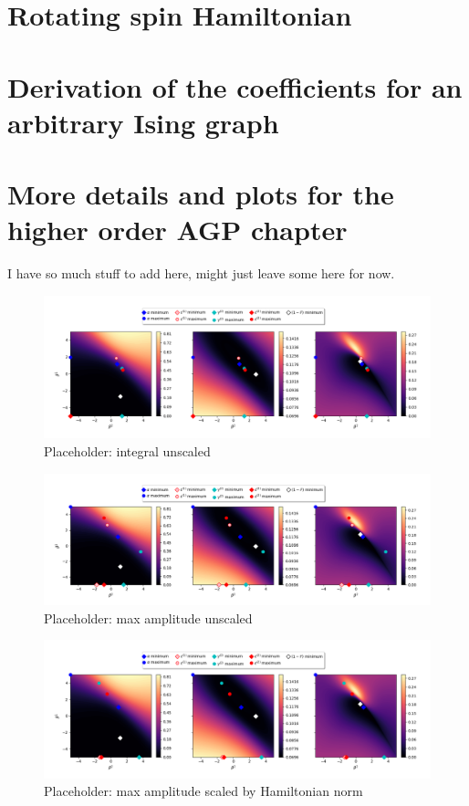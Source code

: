 \appendix

\chapter{Rotating spin Hamiltonian}\label{app:rotating_spin_hamiltonian}

\chapter{Derivation of the  coefficients for an arbitrary Ising graph}\label{app:arbitrary_ising_derivation}

\chapter{More details and plots for the higher order AGP chapter}\label{app:higher_order_AGP}

I have so much stuff to add here, might just leave some here for now. 

\begin{figure}[h]
\centering
\includegraphics[width=\linewidth]{images/2_spins_Integrals_no_norm_final.png} \caption{Placeholder: integral unscaled}\label{fig:}
\end{figure}

\begin{figure}[h]
\centering
\includegraphics[width=\linewidth]{images/2spin_Maximums_no_norm_final} \caption{Placeholder: max amplitude unscaled}\label{fig:}
\end{figure}

\begin{figure}[h]
\centering
\includegraphics[width=\linewidth]{images/2spins_Maximums_scaled_by_norm_final.png} \caption{Placeholder: max amplitude scaled by Hamiltonian norm}\label{fig:}
\end{figure}

